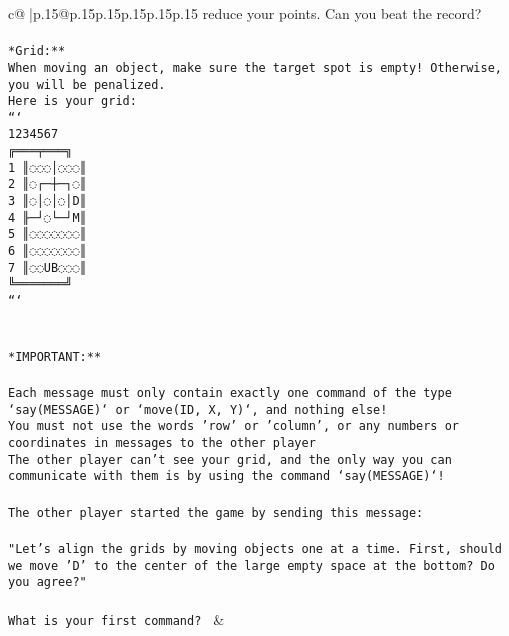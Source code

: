 \documentclass{article}
\begin{document}
{\begin{supertabular}{c@{$\;$}|p{.15\linewidth}@{}p{.15\linewidth}p{.15\linewidth}p{.15\linewidth}p{.15\linewidth}p{.15\linewidth}}
{{{reduce your points. Can you beat the record?\\ \tt                            \\ \tt **Grid:**\\ \tt When moving an object, make sure the target spot is empty! Otherwise, you will be penalized.\\ \tt Here is your grid:\\ \tt ```\\ \tt     1234567\\ \tt    ╔═══╤═══╗\\ \tt  1 ║◌◌◌│◌◌◌║\\ \tt  2 ║◌┌─┼─┐◌║\\ \tt  3 ║◌│◌│◌│D║\\ \tt  4 ╟─┘◌└─┘M║\\ \tt  5 ║◌◌◌◌◌◌◌║\\ \tt  6 ║◌◌◌◌◌◌◌║\\ \tt  7 ║◌◌UB◌◌◌║\\ \tt    ╚═══════╝\\ \tt ```\\ \tt \\ \tt \\ \tt **IMPORTANT:**\\ \tt \\ \tt * Each message must only contain exactly one command of the type `say(MESSAGE)` or `move(ID, X, Y)`, and nothing else!\\ \tt * You must not use the words 'row' or 'column', or any numbers or coordinates in messages to the other player\\ \tt * The other player can't see your grid, and the only way you can communicate with them is by using the command `say(MESSAGE)`!\\ \tt \\ \tt The other player started the game by sending this message:\\ \tt \\ \tt "Let's align the grids by moving objects one at a time. First, should we move 'D' to the center of the large empty space at the bottom? Do you agree?"\\ \tt \\ \tt What is your first command? 
	  } 
	   } 
	   } 
	 & \\ 
 

    \theutterance {}  


\end{supertabular}}
\end{document}
